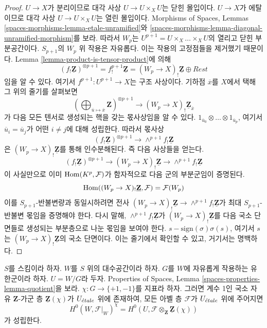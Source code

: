 \begin{proof}
$U \to X$가 분리이므로 대각 사상 $U \to U \times_X U$는
닫힌 몰입이다. $U \to X$가 에탈이므로 대각 사상
$U \to U \times_X U$는 열린 몰입이다. Morphisms of Spaces, Lemmas
\ref{spaces-morphisms-lemma-etale-unramified}와
\ref{spaces-morphisms-lemma-diagonal-unramified-morphism}를 보라.
따라서 $W_p$는 $U^{p + 1} = U \times_X \ldots \times_X U$의
열리고 닫힌 부분공간이다. $S_{p + 1}$의 $W_p$ 위 작용은 자유롭다.
이는 작용의 고정점들을 제거했기 때문이다. Lemma
\ref{lemma-product-is-tensor-product}에 의해
$$
(f_!\underline{\mathbf{Z}})^{\otimes p + 1} =
f^{p + 1}_!\underline{\mathbf{Z}} = (W_p \to X)_!\underline{\mathbf{Z}}
\oplus Rest
$$
임을 알 수 있다. 여기서 $f^{p + 1} : U^{p + 1} \to X$는 구조
사상이다. 기하점 $\overline{x}$를 $X$에서 택해 그 위의 줄기를 살펴보면
$$
\left(
\bigoplus\nolimits_{\overline{u} \mapsto \overline{x}} \mathbf{Z}
\right)^{\otimes p + 1}
\longrightarrow
(W_p \to X)_!\underline{\mathbf{Z}}_{\overline{x}}
$$
가 다음 모든 텐서로 생성되는 핵을 갖는 몫사상임을 알 수 있다.
$1_{\overline{u}_0} \otimes \ldots \otimes 1_{\overline{u}_p}$,
여기서 $\overline{u}_i = \overline{u}_j$가 어떤 $i \not = j$에 대해
성립한다. 따라서 몫사상
$$
(f_!\underline{\mathbf{Z}})^{\otimes p + 1}
\longrightarrow
\wedge^{p + 1}f_!\underline{\mathbf{Z}}
$$
은 $(W_p \to X)_!\underline{\mathbf{Z}}$를 통해 인수분해된다.
즉 다음 사상들을 얻는다.
$$
(f_!\underline{\mathbf{Z}})^{\otimes p + 1}
\longrightarrow
(W_p \to X)_!\underline{\mathbf{Z}}
\longrightarrow
\wedge^{p + 1}f_!\underline{\mathbf{Z}}
$$
이 사실만으로 이미 $\mathop{\mathrm{Hom}}\nolimits(K^p, \mathcal{F})$가 함자적으로 다음 군의
부분군임이 증명된다.
$$
\mathop{\mathrm{Hom}}\nolimits((W_p \to X)_!\underline{\mathbf{Z}}, \mathcal{F}) = \mathcal{F}(W_p)
$$
이를 $S_{p + 1}$-반불변량과 동일시하려면 전사
$(W_p \to X)_!\underline{\mathbf{Z}}
\to \wedge^{p + 1}f_!\underline{\mathbf{Z}}$가 최대
$S_{p + 1}$-반불변 몫임을 증명해야 한다. 다시 말해,
$\wedge^{p + 1}f_!\underline{\mathbf{Z}}$가
$(W_p \to X)_!\underline{\mathbf{Z}}$를 다음 국소 단면들로 생성되는
부분층으로 나눈 몫임을 보여야 한다.
$s - \text{sign}(\sigma)\sigma(s)$, 여기서 $s$는
$(W_p \to X)_!\underline{\mathbf{Z}}$의 국소 단면이다.
이는 줄기에서 확인할 수 있고, 거기서는 명백하다.
\end{proof}

\begin{lemma}
\label{lemma-twist}
$S$를 스킴이라 하자. $W$를 $S$ 위의 대수공간이라 하자.
$G$를 $W$에 자유롭게 작용하는 유한군이라 하자.
$U = W/G$라 두자. Properties of Spaces, Lemma
\ref{spaces-properties-lemma-quotient}을 보라.
$\chi : G \to \{+1, -1\}$를 지표라 하자. 그러면 계수 1인 국소 자유
$\mathbf{Z}$-가군 층 $\underline{\mathbf{Z}}(\chi)$가 $U_{\acute{e}tale}$ 위에
존재하여, 모든 아벨 층 $\mathcal{F}$가 $U_{\acute{e}tale}$ 위에 주어지면
$$
H^0(W, \mathcal{F}|_W)^\chi =
H^0(U, \mathcal{F} \otimes_{\mathbf{Z}} \underline{\mathbf{Z}}(\chi))
$$
가 성립한다.
\end{lemma}

